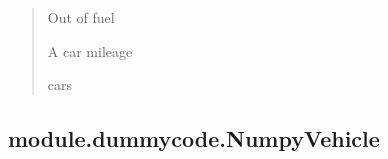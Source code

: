 \documentclass[letterpaper,10pt,english]{sphinxmanual}
\begin{document}
\begin{fulllineitems}
\begin{fulllineitems}
\begin{quote}
\begin{description}
\begin{itemize}
\end{itemize}

\sphinxAtStartPar
{} \textendash{} Out of fuel

\sphinxAtStartPar
A car mileage

\sphinxAtStartPar
cars

\end{description}\end{quote}

\end{fulllineitems}


\end{fulllineitems}


\sphinxstepscope


\subsection{module.dummycode.NumpyVehicle}
\label{\detokenize{_autosummary/module.dummycode.NumpyVehicle:module-dummycode-numpyvehicle}}\label{\detokenize{_autosummary/module.dummycode.NumpyVehicle::doc}}
\end{document}
